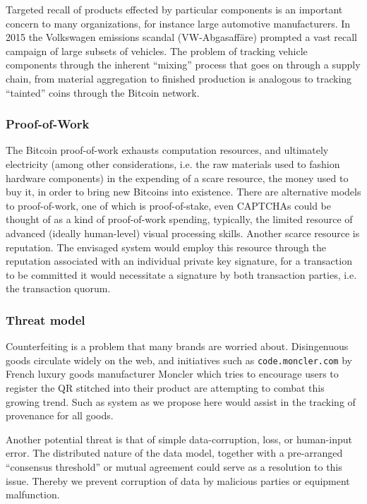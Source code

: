Targeted recall of products effected by particular components is an important concern to many organizations, for instance large automotive manufacturers. 
In 2015 the Volkswagen emissions scandal (VW-Abgasaff{\"a}re) prompted a vast recall campaign of large subsets of vehicles. 
The problem of tracking vehicle components through the inherent ``mixing'' process that goes on through a supply chain, from material aggregation to finished production is analogous to tracking ``tainted'' coins through the Bitcoin network. 

\subsubsection{Proof-of-Work}

The Bitcoin proof-of-work exhausts computation resources, and ultimately electricity (among other considerations, i.e. the raw materials used to fashion hardware components) in the expending of a scare resource, the money used to buy it, in order to bring new Bitcoins into existence. 
There are alternative models to proof-of-work, one of which is proof-of-stake, even CAPTCHAs could be thought of as a kind of proof-of-work spending, typically, the limited resource of advanced (ideally human-level) visual processing skills. 
Another scarce resource is reputation.
The envisaged system would employ this resource through the reputation associated with an individual private key signature, for a transaction to be committed it would necessitate a signature by both transaction parties, i.e. the transaction quorum. 

\subsubsection{Threat model}

Counterfeiting is a problem that many brands are worried about.
Disingenuous goods circulate widely on the web, and initiatives such as \texttt{code.moncler.com} by French luxury goods manufacturer Moncler which tries to encourage users to register the QR stitched into their product are attempting to combat this growing trend. 
Such as system as we propose here would assist in the tracking of provenance for all goods. 

Another potential threat is that of simple data-corruption, loss, or human-input error. 
The distributed nature of the data model, together with a pre-arranged ``consensus threshold'' or mutual agreement could serve as a resolution to this issue. 
Thereby we prevent corruption of data by malicious parties or equipment malfunction.


